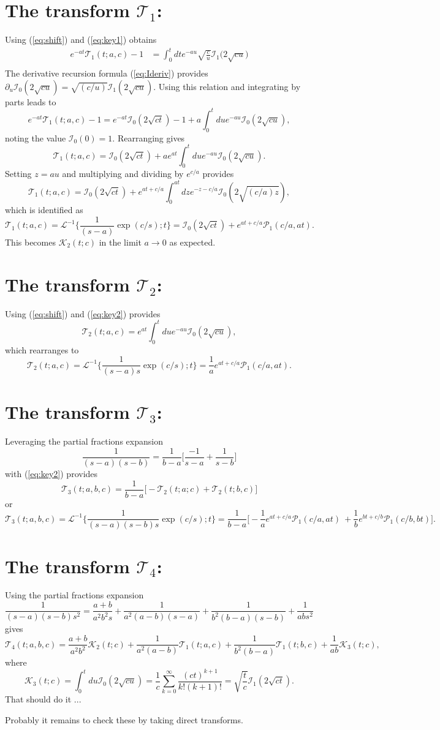 \documentclass[11pt]{article}
\newcommand\be{\begin{equation}} %
\newcommand\ee{\end{equation}}   %
\newcommand\El{\mathcal{L}}
\begin{document}
\section{The transform $\mathcal{T}_1$:}
Using (\ref{eq:shift}) and (\ref{eq:key1}) obtains 
\begin{align}
e^{-at}\mathcal{T}_1(t;a,c)-1 &= \int_0^t dt e^{-au} \sqrt{\frac{c}{u}}\mathcal{I}_1\big(2\sqrt{cu}\big)\\ 
\end{align} 
The derivative recursion formula (\ref{eq:Ideriv}) provides $\partial_u \mathcal{I}_0(2\sqrt{cu}) = \sqrt{(c/u)}\mathcal{I}_1(2\sqrt{cu}).$ Using this relation and integrating by parts leads to 
\be e^{-at}\mathcal{T}_1(t;a,c)-1 = e^{-at}\mathcal{I}_0(2\sqrt{ct})-1 + a\int_0^t du e^{-au} \mathcal{I}_0(2\sqrt{cu}),\ee
noting the value $\mathcal{I}_0(0) = 1$.
Rearranging gives
\be \mathcal{T}_1(t;a,c) = \mathcal{I}_0(2\sqrt{ct}) + a e^{at}\int_0^t du e^{-au }\mathcal{I}_0(2\sqrt{cu}).\ee
Setting $z=au$ and multiplying and dividing by $e^{c/a}$ provides
\be \mathcal{T}_1(t;a,c) = \mathcal{I}_0(2\sqrt{ct}) + e^{at+c/a} \int_0^{at} dz e^{-z - c/a }\mathcal{I}_0(2\sqrt{(c/a)z}),\ee
which is identified as 
\be \mathcal{T}_1(t;a,c) =\El^{-1} \Big\{\frac{1}{(s-a)}\exp(c/s);t\Big\}= \mathcal{I}_0(2\sqrt{ct}) + e^{at+c/a}\mathcal{P}_1(c/a,at).\ee
This becomes $\mathcal{K}_2(t;c)$ in the limit $a\rightarrow 0$ as expected.
\section{The transform $\mathcal{T}_2$:}
Using (\ref{eq:shift}) and (\ref{eq:key2}) provides 
\be \mathcal{T}_2(t;a,c) = e^{at}\int_0^t du e^{-au}\mathcal{I}_0(2\sqrt{cu}),\ee
which rearranges to 
\be \mathcal{T}_2(t;a,c) = \El^{-1} \Big\{\frac{1}{(s-a)s}\exp(c/s);t\Big\} = \frac{1}{a}e^{at+c/a}\mathcal{P}_1(c/a,at).\ee
\section{The transform $\mathcal{T}_3$:}
Leveraging the partial fractions expansion 
\be \frac{1}{(s-a)(s-b)} = \frac{1}{b-a}\Big[\frac{-1}{s-a} + \frac{1}{s-b}\Big]\ee
with (\ref{eq:key2}) provides 
\be \mathcal{T}_3(t;a,b,c) = \frac{1}{b-a}\Big[-\mathcal{T}_2(t;a;c) + \mathcal{T}_2(t;b,c)\Big]\ee
or 
\be \mathcal{T}_3(t;a,b,c) = \El^{-1} \Big\{\frac{1}{(s-a)(s-b)s}\exp(c/s);t\Big\} = \frac{1}{b-a}\Big[-\frac{1}{a}e^{at+c/a}\mathcal{P}_1(c/a,at)\ + \frac{1}{b}e^{bt+c/b}\mathcal{P}_1(c/b,bt)\Big].\ee
\section{The transform $\mathcal{T}_4$:}
Using the partial fractions expansion
\be\frac{1}{(s-a)(s-b)s^2} = \frac{a+b}{a^2b^2s} + \frac{1}{a^2(a-b)(s-a)}+\frac{1}{b^2(b-a)(s-b)} + \frac{1}{abs^2} \ee
gives 
\be \mathcal{T}_4(t;a,b,c) = \frac{a+b}{a^2b^2}\mathcal{K}_2(t;c) + \frac{1}{a^2(a-b)}\mathcal{T}_1(t;a,c) + \frac{1}{b^2(b-a)}\mathcal{T}_1(t;b,c) + \frac{1}{ab}\mathcal{K}_3(t;c),
\ee
where 
\be \mathcal{K}_3(t;c) = \int_0^t du \mathcal{I}_0(2\sqrt{cu}) = \frac{1}{c}\sum_{k=0}^\infty \frac{(ct)^{k+1}}{k!(k+1)!} = \sqrt{\frac{t}{c}} \mathcal{I}_1(2\sqrt{ct}).\ee
That should do it ... 

Probably it remains to check these by taking direct transforms.

\end{document}

